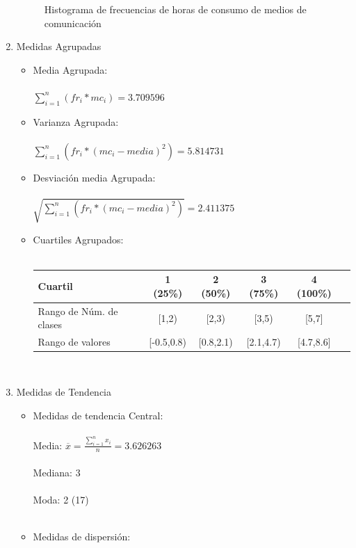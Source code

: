 \documentclass[letterpaper,spanish,11pt]{article}
\begin{document}
\begin{enumerate}
\begin{figure}[htbp]
	  \caption{Histograma de frecuencias de horas de consumo de medios de comunicaci\'on}
	  \label{fig:histograma1}
      \end{figure}
    \item Medidas Agrupadas
	\begin{itemize}
		\item Media Agrupada: \\ \\
		 	$\sum_{i=1} ^n (fr_i * mc_i) = 3.709596$ \\
		\item Varianza Agrupada: \\ \\
			$\sum_{i=1} ^n (fr_i * (mc_i - media)^2) = 5.814731$ \\
		\item Desviaci\'on media Agrupada: \\ \\
			$\sqrt{\sum_{i=1} ^n (fr_i * (mc_i - media)^2)} = 2.411375$ \\
		\item Cuartiles Agrupados: \\ \\
			\begin{tabular}{|l|c|c|c|c|c|}
			\hline
			Cuartil & 1 (25\%) & 2 (50\%) & 3 (75\%) & 4 (100\%) \\
			\hline
			Rango de N\'um. de clases & [1,2) & [2,3) & [3,5) & [5,7] \\
			\hline
			Rango de valores & [-0.5,0.8) & [0.8,2.1) & [2.1,4.7) & [4.7,8.6] \\
			\hline
			\end{tabular} \\
	\end{itemize}
    \item Medidas de Tendencia
	\begin{itemize}
		\item Medidas de tendencia Central: \\ \\
			Media: $\overline{x} = \frac{\sum_{i=1} ^n x_i}{n} = 3.626263$ \\ \\
			Mediana: 3 \\ \\
			Moda: 2 (17)\\ \\
		\item Medidas de dispersi\'on: \\ \\

\end{itemize}
\end{enumerate}
\end{document}
